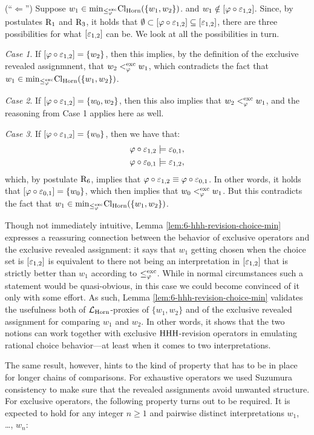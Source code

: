 \begin{prf*}{}{}
	(``$\Leftarrow$'')
	Suppose 
	$w_1\in{\operatorname{min}}_{\le^{{\operatorname{exc}}}_{\varphi}}{\operatorname{Cl}}_{\mathrm{Horn}}(\{w_1,w_2\})$.
	and
	$w_1 \notin [\varphi\circ\varepsilon_{1,2}]$.
	Since, by postulates $\mathrm{R}_{1}$ and $\mathrm{R}_{3}$,
	it holds that $\emptyset\subset [\varphi\circ\varepsilon_{1,2}] \subseteq[\varepsilon_{1,2}]$,
	there are three possibilities for what $[\varepsilon_{1,2}]$ can be.
	We look at all the possibilities in turn.

	\emph{Case 1}.
	If $[\varphi\circ\varepsilon_{1,2}]=\{w_2\}$, 
	then this implies, by the definition of the exclusive 
	revealed assignmnent, 
	that $w_2<^{{\operatorname{exc}}}_{\varphi} w_1$,
	which contradicts the fact that 
	$w_1\in{\operatorname{min}}_{\le^{{\operatorname{exc}}}_{\varphi}}{\operatorname{Cl}}_{\mathrm{Horn}}(\{w_1,w_2\})$.

	\emph{Case 2}.
	If $[\varphi\circ\varepsilon_{1,2}]=\{w_0,w_2\}$, 
	then this also implies that $w_2<^{{\operatorname{exc}}}_{\varphi} w_1$,
	and the reasoning from Case 1 applies here as well.

	\emph{Case 3}.
	If $[\varphi\circ\varepsilon_{1,2}]=\{w_0\}$,
	then we have that:
	\begin{align*}
		\varphi\circ\varepsilon_{1,2}\models\varepsilon_{0,1},\\
		\varphi\circ\varepsilon_{0,1}\models\varepsilon_{1,2},
	\end{align*}
	which, by postulate $\mathrm{R}_{6}$,
	implies that $\varphi\circ\varepsilon_{1,2}\equiv\varphi\circ\varepsilon_{0,1}$.
	In other words, it holds that 
	$[\varphi\circ\varepsilon_{0,1}]=\{w_0\}$,
	which then implies that 
	$w_0<^{{\operatorname{exc}}}_{\varphi} w_1$.
	But this contradicts the fact that 
	$w_1\in{\operatorname{min}}_{\le^{{\operatorname{exc}}}_{\varphi}}{\operatorname{Cl}}_{\mathrm{Horn}}(\{w_1,w_2\})$.
\end{prf*}

Though not immediately intuitive,
Lemma \ref{lem:6-hhh-revision-choice-min} expresses 
a reassuring connection between the behavior of 
exclusive operators and the exclusive revealed assignment:
it says that $w_1$ getting chosen when the choice set is
$[\varepsilon_{1,2}]$ is equivalent to there not being 
an interpretation in $[\varepsilon_{1,2}]$ that 
is strictly better than $w_1$
according to $\le^{{\operatorname{exc}}}_{\varphi}$.
While in normal circumstances such a statement would 
be quasi-obvious, in this case we could become convinced 
of it only with some effort.
As such, Lemma \ref{lem:6-hhh-revision-choice-min}
validates the usefulness both of $\mathcal{L}_{\mathrm{Horn}}$-proxies
of $\{w_1,w_2\}$ and of the exclusive revealed assignment 
for comparing $w_1$ and $w_2$.
In other words, it shows that the two notions can work together with 
exclusive ${\mathrm{HHH}}$-revision operators in emulating 
rational choice behavior---at least when it comes to 
two interpretations.

The same result, however, hints to the kind of property
that has to be in place for longer chains of comparisons.
For exhaustive operators we used Suzumura consistency 
to make sure that the revealed assignments avoid unwanted 
structure.
For exclusive operators, the following property turns out to be required.
It is expected to hold for any integer $n\geq 1$ and pairwise 
distinct interpretations $w_1$, \dots, $w_n$:

